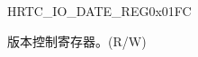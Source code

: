 \begin{register}{H}{RTC\_IO\_DATE\_REG}{0x{}01FC}\label{regdesc:RTCIORTCIODATEREG}
%
%
\regnewline%
\begin{regdesc}\begin{reglist}
\label{fielddesc:RTCIOIODATE}\item [RTC\_IO\_DATE] 版本控制寄存器。(R/W)
\end{reglist}\end{regdesc}
\end{register}


